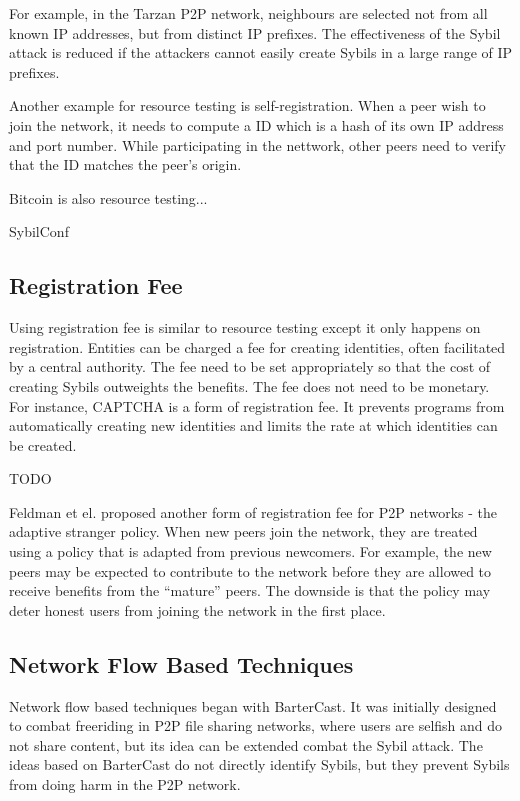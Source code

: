 For example, in the Tarzan P2P network, neighbours are selected not from all
known IP addresses, but from distinct IP prefixes\cite{freedman2002tarzan}. The
effectiveness of the Sybil attack is reduced if the attackers cannot easily
create Sybils in a large range of IP prefixes.

Another example for resource
testing is self-registration\cite{dinger2006defending}. When a peer wish to join
the network, it needs to compute a ID which is a hash of its own IP address and
port number. While participating in the nettwork, other peers need to verify
that the ID matches the peer's origin.

Bitcoin is also resource testing...

SybilConf\cite{tegeler2010sybilconf}

\subsection{Registration Fee}
Using registration fee is similar to resource testing except it only happens on
registration. Entities can be charged a fee for creating identities, often 
facilitated by a central authority. The fee need to be set appropriately so that
the cost of creating Sybils outweights the benefits. The fee does not need to be
monetary. For instance, CAPTCHA\cite{von2003captcha} is a form of
registration fee. It prevents programs from automatically creating new
identities and limits the rate at which identities can be created.

TODO \cite{resnick2001social}

Feldman et el. proposed another form of registration fee for P2P networks - the
adaptive stranger policy\cite{feldman2004robust}. When new peers join the
network, they are treated using a policy that is adapted from previous
newcomers. For example, the new peers may be expected to contribute to the
network before they are allowed to receive benefits from the ``mature'' peers.
The downside is that the policy may deter honest users from joining the network
in the first place.


\subsection{Network Flow Based Techniques}\label{sec:network-flow}
Network flow based techniques began with
BarterCast\cite{meulpolder2009bartercast}. It was initially designed to combat
freeriding in P2P file sharing networks, where users are selfish and do not
share content, but its idea can be extended combat the Sybil attack. The ideas
based on BarterCast do not directly identify Sybils, but they prevent Sybils
from doing harm in the P2P network.

